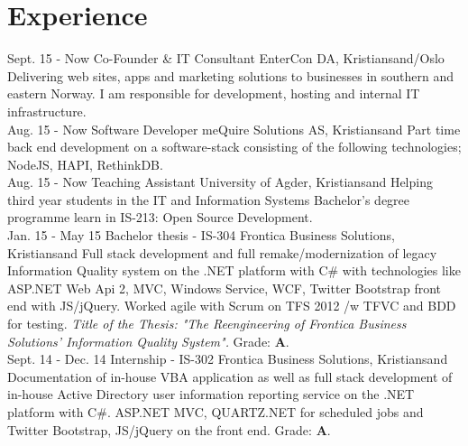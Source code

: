 \documentclass[]{cv-class}
\begin{document}
\section{Experience}
\begin{entrylist}
  \entry
    {Sept. 15 - Now}
    {Co-Founder \& IT Consultant}
    {EnterCon DA, Kristiansand/Oslo}
    {Delivering web sites, apps and marketing solutions to businesses
    in southern and eastern Norway. I am responsible for development,
    hosting and internal IT infrastructure.\\}
  \entry
    {Aug. 15 - Now}
    {Software Developer}
    {meQuire Solutions AS, Kristiansand}
    {Part time back end development on a software-stack consisting of the following
    technologies; NodeJS, HAPI, RethinkDB.\\}
  \entry
    {Aug. 15 - Now}
    {Teaching Assistant}
    {University of Agder, Kristiansand}
    {Helping third year students in the IT and Information Systems Bachelor's degree programme
    learn in IS-213: Open Source Development.\\}
  \entry
    {Jan. 15 - May 15}
    {Bachelor thesis - IS-304}
    {Frontica Business Solutions, Kristiansand}
    {Full stack development and full remake/modernization of legacy Information Quality system
    on the .NET platform with C\# with technologies like ASP.NET Web Api 2,
    MVC, Windows Service, WCF,
    Twitter Bootstrap front end with JS/jQuery. Worked agile with Scrum on TFS 2012 /w TFVC
    and BDD for testing.
    \emph{Title of the Thesis:
    "The Reengineering of Frontica Business Solutions' Information Quality System".}
    Grade: \textbf{A}.\\}
  \entry
    {Sept. 14 - Dec. 14}
    {Internship - IS-302}
    {Frontica Business Solutions, Kristiansand}
    {Documentation of in-house VBA application as well as full stack development of
    in-house Active Directory
    user information reporting service on the .NET platform with C\#. ASP.NET MVC,
    QUARTZ.NET for scheduled jobs
    and Twitter Bootstrap, JS/jQuery on the front end. Grade: \textbf{A}.\\}
\end{entrylist}
\end{document}
